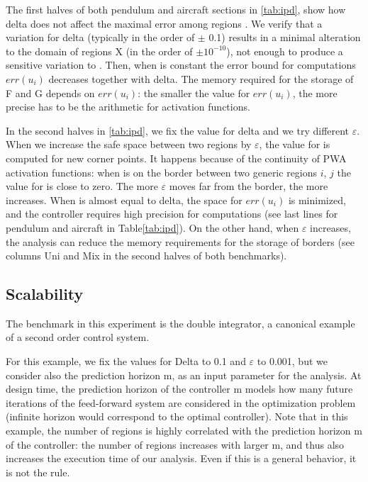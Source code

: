 The first halves of both pendulum and aircraft sections in \autoref{tab:ipd}, show how delta does not affect the maximal error among regions \maxUij. We verify that a variation for delta (typically in the order of $\pm$ 0.1) results in a minimal alteration to the domain of regions X (in the order of $\pm 10^{-10}$), not enough to produce a sensitive variation to \maxUij. Then, when \maxUij\space is constant the error bound for computations $err(u_{i})$ decreases together with delta. The memory required for the storage of F and G depends on $err(u_{i})$: the smaller the value for $err(u_{i})$, the more precise has to be the arithmetic for activation functions. 

In the second halves in \autoref{tab:ipd}, we fix the value for delta and we try different $\varepsilon$. When we increase the safe space between two regions by $\varepsilon$, the value for \maxUij is computed for new corner points. It happens because of the continuity of PWA activation functions: when \statevarmath is on the border between two generic regions $i$, $j$ the value for \maxUij is close to zero. The more $\varepsilon$ moves \statevarmath far from the border, the more \maxUij increases. When \maxUij is almost equal to delta, the space for $err(u_{i})$ is minimized, and the controller requires high precision for computations (see last lines for pendulum and aircraft in Table\ref{tab:ipd}). On the other hand, when $\varepsilon$ increases, the analysis can reduce the memory requirements for the storage of borders (see columns Uni and Mix in the second halves of both benchmarks).




\subsection{Scalability}
The benchmark in this experiment is the double integrator, a canonical example
of a second order control system. 

For this example, we fix the values for Delta to 0.1 and $\varepsilon$ to 0.001,
but we consider also the prediction horizon m, as an input parameter for the
analysis. At design time, the prediction horizon of the controller m models how
many future iterations of the feed-forward system are considered in the
optimization problem (infinite horizon would correspond to the optimal
controller). Note that in this example, the number of regions is highly
correlated with the prediction horizon m of the controller: the number of regions
increases with larger m, and thus also increases the execution time of our analysis.
Even if this is a general behavior, it is not the rule.

